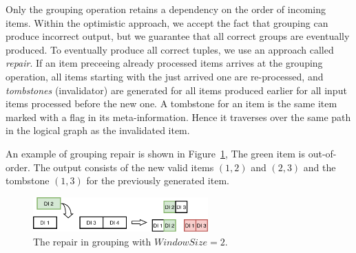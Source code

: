 Only the grouping operation retains a dependency on the order of incoming items. 
%
Within the  optimistic approach, we accept the fact that grouping can produce incorrect output, but we guarantee that all correct groups are eventually produced. 
To eventually produce all correct tuples, we use an approach called {\it repair}. 
If an item preceeing already processed items arrives at the grouping operation, all items starting with the just arrived one are re-processed, and {\em tombstones} (invalidator) are generated for all items produced earlier for all input items processed before the new one. 
A tombstone for an item is the same item marked with a flag in its meta-information. Hence it traverses over the same path in the logical graph as the invalidated item.



An example of grouping repair is shown in Figure~\ref{grouping-replaying}, 
The green item is out-of-order. 
The output consists of the new valid items  $(1, 2)$ and $(2, 3)$  and the tombstone $(1, 3)$ for the previously generated item.

\begin{figure}[ht]
  \centering
  \includegraphics[width=0.6\textwidth]{pics/grouping-replaying}
  \caption{The repair in grouping with $WindowSize = 2$. %
  }
  \label {grouping-replaying}
\end{figure}

